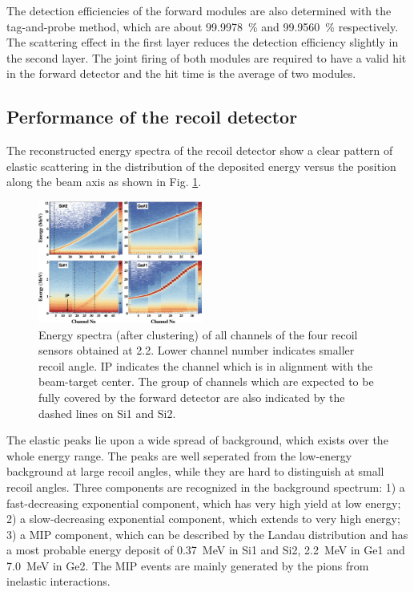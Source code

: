\documentclass[number,5p]{elsarticle}
\begin{document}
The detection efficiencies of the forward modules are also determined with the
tag-and-probe method, which are about \SI{99.9978}{\percent} and \SI{99.9560}{\percent} respectively.
The scattering effect in the first layer reduces the detection efficiency slightly in the second layer.
The joint firing of both modules are required to have a valid hit in the
forward detector and the hit time is the average of two modules.

\subsection{Performance of the recoil detector}
\label{sec:recoil_performance}
The reconstructed energy spectra of the recoil detector show a clear pattern
of elastic scattering in the distribution of the deposited energy versus the
position along the beam axis as shown in Fig. \ref{fig:e_map}.
\begin{figure}[tb!]
  \centering
  \includegraphics[width=0.48\textwidth]{./e_map.png}
  \caption{Energy spectra (after clustering) of all channels of the four recoil
    sensors obtained at \SI{2.2}{\momentum}.
    Lower channel number indicates smaller recoil angle.
    IP indicates the channel which is in alignment with
    the beam-target center.
    The group of channels which are expected to be fully covered by the forward detector are
    also indicated by the dashed lines on Si1 and Si2.
  }
  \label{fig:e_map}
\end{figure}
The elastic peaks lie upon a wide spread of background, which exists over the whole energy range.
The peaks are well seperated from the low-energy background at large recoil angles, while they are hard to distinguish at small recoil angles.
Three components are recognized in the background spectrum:
1) a fast-decreasing exponential component, which has very high yield at low energy;
2) a slow-decreasing exponential component, which extends to very high energy;
3) a MIP component, which can be described by the Landau distribution and has a most probable energy deposit of \SI{0.37}{\MeV} in Si1 and Si2, \SI{2.2}{\MeV} in Ge1 and \SI{7.0}{\MeV} in Ge2.
The MIP events are mainly generated by the pions from inelastic interactions.
\end{document}
